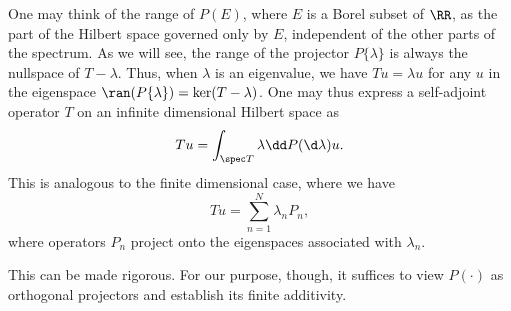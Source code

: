 \documentclass[oneside,reqno,letterpaper]{amsart}
\begin{document}
One may think of the range of \(P(E)\), where \(E\) is a Borel subset of \(\RR\), as the part of the Hilbert space governed only by \(E\), independent of the other parts of the spectrum.
As we will see, the range of the projector \(P \{\lambda\}\) is always the nullspace of \(T - \lambda\). 
Thus, when \(\lambda\) is an eigenvalue, we have \(T u = \lambda u\) for any \(u\) in the eigenspace \(\ran(P \{\lambda\}) = \ker(T - \lambda)\). 
One may thus express a self-adjoint operator \(T\) on an infinite dimensional Hilbert space as 
\[
  Tu = \int_{\spec T} \lambda \dd P(\d\lambda) u . 
\] 
This is analogous to the finite dimensional case, where we have 
\[
  T u = \sum_{n=1}^{N} \lambda_n P_n , 
\] 
where operators \(P_n\) project onto the eigenspaces associated with \(\lambda_n\). 


This can be made rigorous. 
For our purpose, though, it suffices to view \(P(\cdot)\) as orthogonal projectors and establish its finite additivity.
\end{document}
